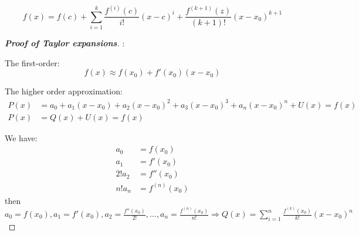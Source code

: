 \begin{proposition}
    \begin{equation*}
        f(x) = f(c) + \sum_{i=1}^{k}\frac{f ^{(i)}(c)}{i!}(x-c)^{i} + \frac{f ^{(k+1)}(z)}{(k+1)!}(x-x_0)^{k+1}
    \end{equation*}
\end{proposition}


\begin{proof}[\textbf{Proof of Taylor expansions}]:

    The first-order: \begin{equation*}
        f(x) \approx f(x_0) + f'(x_0)(x-x_0)
    \end{equation*}

    The higher order approximation:
    \begin{align*}
        P(x) & = a_0 + a_{1}(x-x_0) + a_{2}(x-x_0)^{2} + a_{3}(x-x_0)^{3} + a_{n}(x-x_0)^{n} + U(x) = f(x) \\
        P(x) & = Q(x) + U(x) = f(x)
    \end{align*}

    We have:
    \begin{align*}
        a_0     & = f(x_0)       \\
        a_{1}   & = f'(x_0)      \\
        2!a_{2} & = f''(x_0)     \\
        n!a_{n} & = f^{(n)}(x_0)
    \end{align*}
    then $a_{0} = f(x_0), a_{1} = f'(x_0), a_{2}=\frac{f''(x_0)}{2!}, \dots, a_{n} = \frac{f^{(n)}(x_0)}{n!} \Rightarrow Q(x) = \sum_{i=1}^{n} \frac{f ^{(k)}(x_0)}{k!}(x-x_0)^{n}$


\end{proof}
